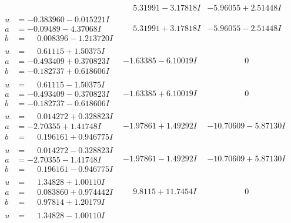 \documentclass[1p]{elsarticle_modified}
\theoremstyle{definition}
\begin{document}
$$\begin{array}{c|c|c}
 & \phantom{-}5.31991 - 3.17818 I & -5.96055 + 2.51448 I \\ \hline\begin{aligned}
u &= -0.383960 - 0.015221 I \\
a &= -0.09489 - 4.37068 I \\
b &= \phantom{-}0.008396 - 1.213720 I\end{aligned}
 & \phantom{-}5.31991 + 3.17818 I & -5.96055 - 2.51448 I \\ \hline\begin{aligned}
u &= \phantom{-}0.61115 + 1.50375 I \\
a &= -0.493409 + 0.370823 I \\
b &= -0.182737 + 0.618606 I\end{aligned}
 & -1.63385 - 6.10019 I & \phantom{-0.000000 } 0 \\ \hline\begin{aligned}
u &= \phantom{-}0.61115 - 1.50375 I \\
a &= -0.493409 - 0.370823 I \\
b &= -0.182737 - 0.618606 I\end{aligned}
 & -1.63385 + 6.10019 I & \phantom{-0.000000 } 0 \\ \hline\begin{aligned}
u &= \phantom{-}0.014272 + 0.328823 I \\
a &= -2.70355 + 1.41748 I \\
b &= \phantom{-}0.196161 + 0.946775 I\end{aligned}
 & -1.97861 + 1.49292 I & -10.70609 - 5.87130 I \\ \hline\begin{aligned}
u &= \phantom{-}0.014272 - 0.328823 I \\
a &= -2.70355 - 1.41748 I \\
b &= \phantom{-}0.196161 - 0.946775 I\end{aligned}
 & -1.97861 - 1.49292 I & -10.70609 + 5.87130 I \\ \hline\begin{aligned}
u &= \phantom{-}1.34828 + 1.00110 I \\
a &= \phantom{-}0.083860 + 0.974442 I \\
b &= \phantom{-}0.97814 + 1.20179 I\end{aligned}
 & \phantom{-}9.8115 + 11.7454 I & \phantom{-0.000000 } 0 \\ \hline\begin{aligned}
u &= \phantom{-}1.34828 - 1.00110 I \\

\end{aligned}
\end{array}$$
\end{document}
